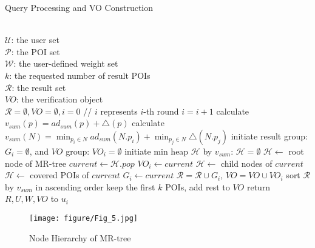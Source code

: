 \documentclass[10pt, conference, compsocconf]{IEEEtran}
\begin{document}
\begin{algorithm}[H]\scriptsize
	\caption{Query Processing and VO Construction}
	\label{Algorithm1}
	\begin{algorithmic}[1]
		\REQUIRE~~ \\
		$\mathcal{U}$: the user set \\
		$\mathcal{P}$: the POI set \\
		$\mathcal{W}$: the user-defined weight set \\
		$k$: the requested number of result POIs
		\ENSURE~~ \\
		$\mathcal{R}$: the result set \\
		$VO$: the verification object \\
		\STATE $\mathcal{R} = \emptyset, VO = \emptyset, i = 0$ // $i$ represents $i$-th round
		    \STATE $i = i + 1$
			    \STATE calculate $v_{sum}(p) = ad_{sum}(p) + \triangle(p)$
			    \STATE calculate $v_{sum}(N) = \min_{p_i \in N} ad_{sum}(N.p_i) + \min_{p_j \in N} \triangle(N.p_j)$
			\ENDFOR
			\STATE initiate result group: $G_{i} = \emptyset$, and $VO$ group: $VO_{i} = \emptyset$
    		\STATE initiate min heap $\mathcal{H}$ by $v_{sum}$: $\mathcal{H} = \emptyset$
			\STATE $\mathcal{H} \leftarrow$ root node of MR-tree
		    \STATE $current \leftarrow \mathcal{H}.pop$
		        \STATE $VO_{i} \leftarrow current$
		    \ELSE
    		        \STATE $\mathcal{H} \leftarrow$ child nodes of $current$
	    	        \STATE $\mathcal{H} \leftarrow$ covered POIs of $current$
		        \ELSE
		            \STATE $G_{i} \leftarrow current$
		        \ENDIF
		    \ENDIF
		\ENDWHILE
		\STATE $\mathcal{R} = \mathcal{R} \cup G_{i}$, $VO = VO \cup VO_i$
		\ENDWHILE
            \STATE sort $\mathcal{R}$ by $v_{sum}$ in ascending order
            \STATE keep the first $k$ POIs, add rest to $VO$
        \ENDIF
		\STATE return $R, U, W, VO$ to $u_i$
		\ENDFOR
	\end{algorithmic}
\end{algorithm}

\begin{figure}[htbp]
	\centering
	\texttt{[image: figure/Fig\_5.jpg]}
	\caption{Node Hierarchy of MR-tree}\label{MR-TreeExample}
\end{figure}
\end{document}
